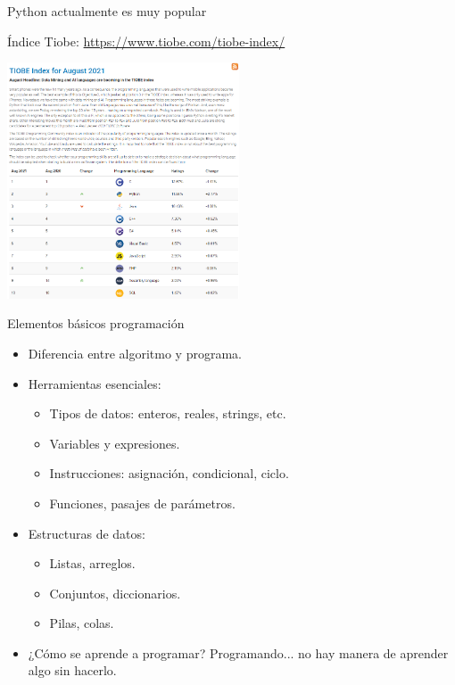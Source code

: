 \documentclass{beamer}
\begin{document}
\begin{frame}{Python actualmente es muy popular}
\begin{block}{Índice Tiobe:}
	\url{https://www.tiobe.com/tiobe-index/}
\end{block}
\includegraphics[height=7cm]{tiobeIndex.png}
\end{frame}


\begin{frame}{Elementos básicos programación}
\begin{itemize}
	\item Diferencia entre algoritmo y programa.\pause
	\item Herramientas esenciales:
	\begin{itemize}
		\item Tipos de datos: enteros, reales, strings, etc.%
		\item Variables y expresiones.%
		\item Instrucciones: asignación, condicional, ciclo.%
		\item Funciones, pasajes de parámetros.
	\end{itemize}\pause
	\item Estructuras de datos:
	\begin{itemize}
		\item Listas, arreglos.
		\item Conjuntos, diccionarios.
		\item Pilas, colas.
	\end{itemize}\pause
	\item ¿Cómo se aprende a programar? \pause Programando... no hay manera de aprender algo sin hacerlo.
\end{itemize}

\end{frame}
\end{document}
